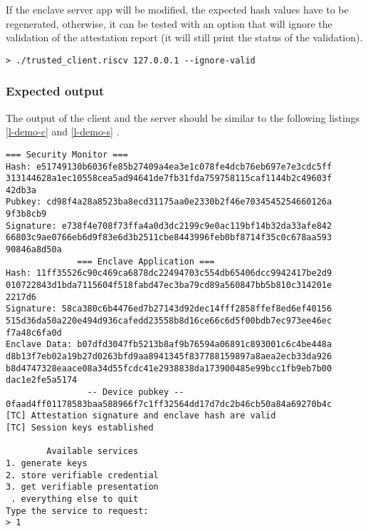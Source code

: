 If the enclave server app will be modified, the expected hash values have to be regenerated, otherwise, it can be tested with an option that will ignore the validation of the attestation report (it will still print the status of the validation). 

\begin{lstlisting}[frame=single]
  > ./trusted_client.riscv 127.0.0.1 --ignore-valid        
\end{lstlisting}

\subsubsection{Expected output}
The output of the client and the server should be similar to the following listings \ref{l-demo-c} and \ref{l-demo-s} . 
\begin{lstlisting}[caption={Example of output at client side},captionpos=b,style=DOS,label={l-demo-c},frame=single]
              === Security Monitor ===
Hash: e51749130b6036fe85b27409a4ea3e1c078fe4dcb76eb697e7e3cdc5ff
313144628a1ec10558cea5ad94641de7fb31fda759758115caf1144b2c49603f
42db3a
Pubkey: cd98f4a28a8523ba8ecd31175aa0e2330b2f46e7034545254660126a
9f3b8cb9
Signature: e738f4e708f73ffa4a0d3dc2199c9e0ac119bf14b32da33afe842
66803c9ae0766eb6d9f83e6d3b2511cbe8443996feb0bf8714f35c0c678aa593
90846a8d50a
              === Enclave Application ===
Hash: 11ff35526c90c469ca6878dc22494703c554db65406dcc9942417be2d9
010722843d1bda7115604f518fabd47ec3ba79cd89a560847bb5b810c314201e
2217d6
Signature: 58ca380c6b4476ed7b27143d92dec14fff2858ffef8ed6ef40156
515d36da50a220e494d936cafedd23558b8d16ce66c6d5f00bdb7ec973ee46ec
f7a48c6fa0d
Enclave Data: b07dfd3047fb5213b8af9b76594a06891c893001c6c4be448a
d8b13f7eb02a19b27d0263bfd9aa8941345f837788159897a8aea2ecb33da926
b8d4747328eaace08a34d55fcdc41e2938838da173900485e99bcc1fb9eb7b00
dac1e2fe5a5174
                -- Device pubkey --
0faad4ff01178583baa588966f7c1ff32564dd17d7dc2b46cb50a84a69270b4c
[TC] Attestation signature and enclave hash are valid
[TC] Session keys established

        Available services
1. generate keys
2. store verifiable credential
3. get verifiable presentation
 . everything else to quit 
Type the service to request:
> 1
\end{lstlisting}
\leavevmode\newline

